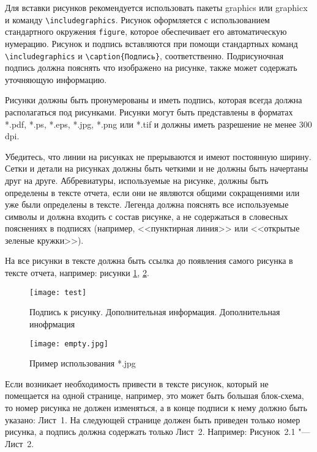 Для вставки рисунков рекомендуется использовать пакеты graphics или graphicx
и команду \verb|\includegraphics|. Рисунок оформляется с использованием
стандартного окружения \verb|figure|, которое обеспечивает его автоматическую
нумерацию. Рисунок и подпись вставляются при помощи стандартных команд
\verb|\includegraphics| и \verb|\caption{Подпись}|, соответственно.
Подрисуночная подпись должна пояснять что изображено на рисунке, также может
содержать уточняющую информацию. 

Рисунки должны быть пронумерованы и иметь подпись, которая всегда должна
располагаться  под рисунками. Рисунки могут быть представлены в форматах
*.pdf, *.ps, *.eps, *.jpg,  *.png или *.tif и должны иметь разрешение не
менее 300 dpi. 

Убедитесь, что линии на рисунках не прерываются и имеют постоянную ширину.
Сетки и детали на рисунках должны быть четкими и не должны быть начертаны
друг на друге. Аббревиатуры, используемые на рисунке, должны быть определены
в тексте отчета, если они не являются общими сокращениями или уже были
определены в тексте. Легенда должна пояснять все используемые символы и
должна входить с состав рисунке, а не содержаться в словесных пояснениях
в подписях (например, <<пунктирная линия>> или <<открытые зеленые кружки>>).

На все рисунки в тексте должна быть ссылка до появления самого рисунка в
тексте отчета, например: рисунки \ref{fig:01}, \ref{fig:02}.

\begin{figure}[h!]
\begin{center}
\texttt{[image: test]}\\[2mm]
\caption{Подпись к рисунку. Дополнительная информация. Дополнительная инофрмация}
\label{fig:01}
\end{center}
\end{figure}

\begin{figure}[h!]
\begin{center}
\texttt{[image: empty.jpg]}\\[2mm]
\caption{Пример использования *.jpg}
\label{fig:02}
\end{center}
\end{figure}

Если возникает необходимость привести в тексте рисунок, который не помещается
на одной странице, например, это может быть большая блок-схема, то номер
рисунка не должен изменяться, а в конце подписи к нему должно быть указано:
Лист~1. На следующей странице должен быть приведен только номер рисунка,
а подпись должна содержать только Лист~2.
Например: Рисунок~2.1 "--- Лист~2.


